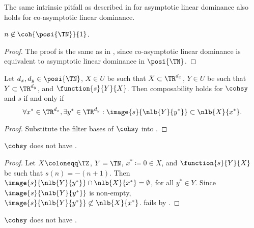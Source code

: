 \documentclass[b5paper, english, oneside]{memoir}
\begin{document}
\begin{note}
The same intrinsic pitfall as described in  for asymptotic linear dominance also holds for co-asymptotic linear dominance.
\end{note}

\begin{theorem}
\label{CoasymptoticOneSeparation}
$n \not\in \coh{\posi{\TN}}{1}$.
\end{theorem}

\begin{proof}
The proof is the same as in , since co-asymptotic linear dominance is equivalent to asymptotic linear dominance in $\posi{\TN}$.
\end{proof}

\begin{theorem}
\label{CoasymptoticCompositionForFixedS}
Let $d_x, d_y \in \posi{\TN}$, $X \in U$ be such that $X \subset \TR^{d_x}$, $Y \in U$ be such that $Y \subset \TR^{d_y}$, and $\function{s}{Y}{X}$. Then composability holds for $\cohsy$ and $s$ if and only if
\begin{equation}
\forall x^* \in \TR^{d_x}, \exists y^* \in \TR^{d_y}: \image{s}{\nlb{Y}{y^*}} \subset \nlb{X}{x^*}.
\end{equation}
\end{theorem}

\begin{proof}
Substitute the filter bases of $\cohsy$ into .
\end{proof}

\begin{theorem}
\label{CoasymptoticInjectiveSubComposabilityFails}
$\cohsy$ does not have .
\end{theorem}

\begin{proof}
Let $X \coloneqq \TZ$, $Y = \TN$, $x^* \coloneqq 0 \in X$, and $\function{s}{Y}{X}$ be such that $s(n) = -(n + 1)$. Then $\image{s}{\nlb{Y}{y^*}} \cap \nlb{X}{x^*} = \emptyset$, for all $y^* \in Y$. Since $\image{s}{\nlb{Y}{y^*}}$ is non-empty, $\image{s}{\nlb{Y}{y^*}} \not\subset \nlb{X}{x^*}$.  fails by .
\end{proof}

\begin{theorem}
\label{CoasymptoticExtensibilityFails}
$\cohsy$ does not have .
\end{theorem}
\end{document}
